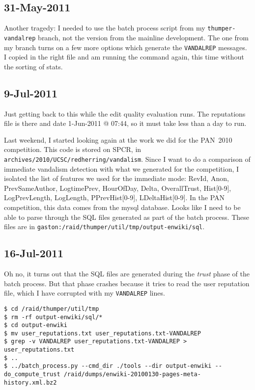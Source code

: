 \subsection{31-May-2011}

Another tragedy: I needed to use the batch process script from
my \texttt{thumper-vandalrep} branch, not the version from the
mainline development.
The one from my branch turns on a few more options which generate
the \texttt{VANDALREP} messages.
I copied in the right file and am running the command again,
this time without the sorting of stats.

\subsection{9-Jul-2011}

Just getting back to this while the edit quality evaluation runs.
The reputations file is there and date 1-Jun-2011 @ 07:44,
so it must take less than a day to run.

Last weekend, I started looking again at the work we did
for the PAN~2010 competition.
This code is stored on SPCR, in
\texttt{archives/2010/UCSC/redherring/vandalism}.
Since I want to do a comparison of immediate vandalism
detection with what we generated for the competition,
I isolated the list of features we used for the immediate mode:
RevId, Anon, PrevSameAuthor, LogtimePrev, HourOfDay,
Delta, OverallTrust, Hist[0-9], LogPrevLength,
LogLength, PPrevHist[0-9], LDeltaHist[0-9].
In the PAN competition, this data comes from the mysql database.
Looks like I need to be able to parse through the SQL files
generated as part of the batch process.
These files are in
\texttt{gaston:/raid/thumper/util/tmp/output-enwiki/sql}.

\subsection{16-Jul-2011}

Oh no, it turns out that the SQL files are generated during the
\textit{trust} phase of the batch process.
But that phase crashes because it tries to read the user reputation
file, which I have corrupted with my \texttt{VANDALREP} lines.

\begin{verbatim}
$ cd /raid/thumper/util/tmp
$ rm -rf output-enwiki/sql/*
$ cd output-enwiki
$ mv user_reputations.txt user_reputations.txt-VANDALREP
$ grep -v VANDALREP user_reputations.txt-VANDALREP > user_reputations.txt
$ ..
$ ../batch_process.py --cmd_dir ./tools --dir output-enwiki --do_compute_trust /raid/dumps/enwiki-20100130-pages-meta-history.xml.bz2
\end{verbatim}

